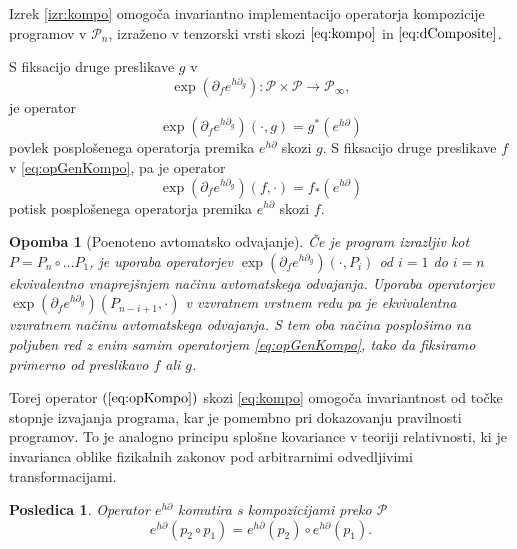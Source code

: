 \documentclass[a4paper, 12pt]{book}
\newcommand{\ed}{e^{h\partial}}
\newcommand{\dP}{\mathcal{P}}
\newcommand{\D}{\partial}
\newtheorem{posledica}{Posledica}[chapter]
\newtheorem{opomba}{Opomba}[chapter]
\begin{document}
 
 \noindent Izrek \ref{izr:kompo} omogoča invariantno implementacijo operatorja kompozicije programov v $\dP_n$, izraženo v tenzorski vrsti skozi $\eqref{eq:kompo}$ in $\eqref{eq:dComposite}$.
 
  S fiksacijo druge preslikave $g$ v  
   \begin{equation}\label{eq:opGenKompo}
  \exp(\D_fe^{h\D_g}): \dP\times\dP\to\dP_\infty,
   \end{equation}
   je operator
   \begin{equation}
    \exp(\D_fe^{h\D_g})(\cdot,g)=g^*\left( e^{h\D} \right)\label{eq:opKompo}
  \end{equation}
  povlek posplošenega operatorja premika $\ed$ skozi $g$. S fiksacijo druge preslikave $f$ v \eqref{eq:opGenKompo}, pa je operator
    \begin{equation}
   \exp(\D_fe^{h\D_g})(f,\cdot)=f_*\left( e^{h\D} \right)\label{eq:opKompoForward}
   \end{equation}
potisk posplošenega operatorja premika $\ed$ skozi $f$.

\begin{opomba}[Poenoteno avtomatsko odvajanje]
\label{trd:reverseForward}
Če je program izrazljiv kot $P=P_n\circ\ldots P_1$, je uporaba operatorjev
  $\exp(\D_fe^{h\D_g})(\cdot,P_i)$ od $i=1$ do $i=n$ ekvivalentno vnaprejšnjem načinu avtomatskega odvajanja.
  Uporaba operatorjev $\exp(\D_fe^{h\D_g})(P_{n-i+1},\cdot)$ v vzvratnem vrstnem redu pa je ekvivalentna vzvratnem načinu  avtomatskega odvajanja.
  S tem oba načina posplošimo na poljuben red z enim samim operatorjem \eqref{eq:opGenKompo}, tako da fiksiramo primerno od preslikavo $f$ ali $g$.
\end{opomba}

Torej operator $(\ref{eq:opKompo})$ skozi \eqref{eq:kompo} omogoča invariantnost od točke stopnje izvajanja programa, kar je pomembno pri dokazovanju pravilnosti programov. To je analogno principu splošne kovariance \cite{GeneralCovariance} v teoriji relativnosti, ki je invarianca oblike fizikalnih zakonov pod arbitrarnimi odvedljivimi transformacijami.

\begin{posledica}\label{izr:komp_homo}
   Operator $e^{h\D}$ komutira s kompozicijami preko $\dP$
   \begin{equation*}
   e^{h\D}(p_2\circ p_1)=e^{h\D}(p_2)\circ e^{h\D}(p_1).
   \end{equation*}
   \end{posledica}
   
\end{document}
